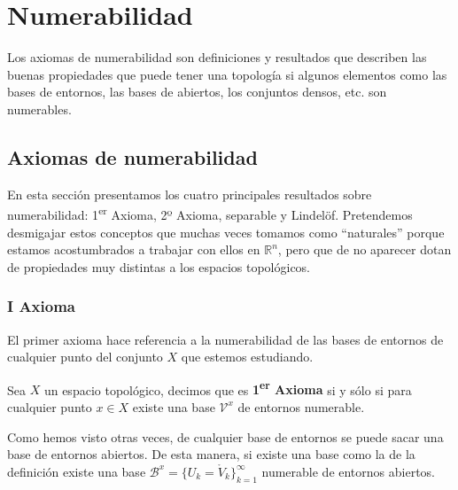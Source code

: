 \chapter{Numerabilidad}%
\label{cha:numerabilidad}
Los axiomas de numerabilidad son definiciones y resultados que describen las buenas propiedades que puede tener una topología si algunos elementos como las bases de entornos, las bases de abiertos, los conjuntos densos, etc. son numerables.

\section{Axiomas de numerabilidad}%
\label{sec:axiomas}
En esta sección presentamos los cuatro principales resultados sobre numerabilidad: 1\textsuperscript{er} Axioma, 2º Axioma, separable y Lindelöf. Pretendemos desmigajar estos conceptos que muchas veces tomamos como ``naturales'' porque estamos acostumbrados a trabajar con ellos en $\mathbb{R}^n$, pero que de no aparecer dotan de propiedades muy distintas a los espacios topológicos.

\subsection{I Axioma}%
\label{sub:i_axioma}
El primer axioma hace referencia a la numerabilidad de las bases de entornos de cualquier punto del conjunto $X$ que estemos estudiando.

\begin{defi}
Sea $X$ un espacio topológico, decimos que es \textbf{1\textsuperscript{er} Axioma} si y sólo si para cualquier punto $x\in X$ existe una base $\mathcal{V}^x$ de entornos numerable.
\end{defi}

\begin{obs}
Como hemos visto otras veces, de cualquier base de entornos se puede sacar una base de entornos abiertos. De esta manera, si existe una base como la de la definición existe una base $\mathcal{B}^x = \{U_k = \mathring{V}_k \}_{k = 1}^\infty$ numerable de entornos abiertos.
\end{obs}

